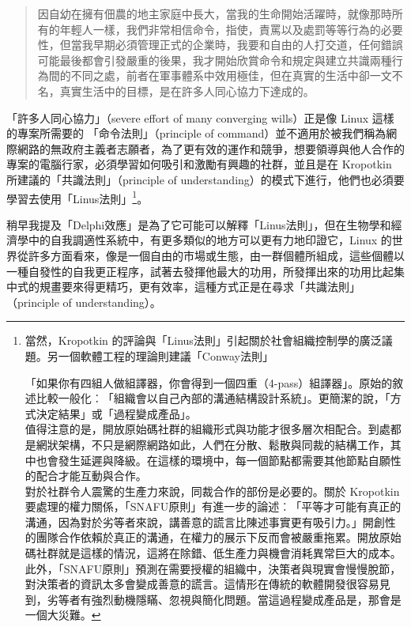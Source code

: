 \documentclass[12pt,]{article}
\makeatletter
\newcommand*{\shifttext}[2]{%
  \settowidth{\@tempdima}{#2}%
  \makebox[\@tempdima]{\hspace*{#1}#2}%
}
\makeatother
\begin{document}
\begin{quote}
因自幼在擁有佃農的地主家庭中長大，當我的生命開始活躍時，就像那時所有的年輕人一樣，我們非常相信命令，指使，責罵以及處罰等等行為的必要性，但當我早期必須管理正式的企業時，我要和自由的人打交道，任何錯誤可能最後都會引發嚴重的後果，我才開始欣賞命令和規定與建立共識兩種行為間的不同之處，前者在軍事體系中效用極佳，但在真實的生活中卻一文不名，真實生活中的目標，是在許多人同心協力下達成的。
\end{quote}

「許多人同心協力」（severe effort of many converging wills）正是像 Linux
這樣的專案所需要的 \shifttext{1pt}{---}\shifttext{-1pt}{---} 「命令法則」（principle of
command）並不適用於被我們稱為網際網路的無政府主義者志願者，為了更有效的運作和競爭，想要領導與他人合作的專案的電腦行家，必須學習如何吸引和激勵有興趣的社群，並且是在
Kropotkin 所建議的「共識法則」（principle of
understanding）的模式下進行，他們也必須要學習去使用「Linus法則」\footnote{當然，Kropotkin
  的評論與「Linus法則」引起關於社會組織控制學的廣泛議題。另一個軟體工程的理論則建議「Conway法則」
  \shifttext{1pt}{---}\shifttext{-1pt}{---}
  「如果你有四組人做組譯器，你會得到一個四重（4-pass）組譯器」。原始的敘述比較一般化︰「組織會以自己內部的溝通結構設計系統」。更簡潔的說，「方式決定結果」或「過程變成產品」。\\值得注意的是，開放原始碼社群的組織形式與功能才很多層次相配合。到處都是網狀架構，不只是網際網路如此，人們在分散、鬆散與同裁的結構工作，其中也會發生延遲與降級。在這樣的環境中，每一個節點都需要其他節點自願性的配合才能互動與合作。\\對於社群令人震驚的生產力來說，同裁合作的部份是必要的。關於
  Kropotkin
  要處理的權力關係，「SNAFU原則」有進一步的論述︰「平等才可能有真正的溝通，因為對於劣等者來說，講善意的謊言比陳述事實更有吸引力。」開創性的團隊合作依賴於真正的溝通，在權力的展示下反而會被嚴重拖累。開放原始碼社群就是這樣的情況，這將在除錯、低生產力與機會消耗異常巨大的成本。\\此外，「SNAFU原則」預測在需要授權的組織中，決策者與現實會慢慢脫節，對決策者的資訊太多會變成善意的謊言。這情形在傳統的軟體開發很容易見到，劣等者有強烈動機隱瞞、忽視與簡化問題。當這過程變成產品是，那會是一個大災難。}。

稍早我提及「Delphi效應」是為了它可能可以解釋「Linus法則」，但在生物學和經濟學中的自我調適性系統中，有更多類似的地方可以更有力地印證它，Linux
的世界從許多方面看來，像是一個自由的市場或生態，由一群個體所組成，這些個體以一種自發性的自我更正程序，試著去發揮他最大的功用，所發揮出來的功用比起集中式的規畫要來得更精巧，更有效率，這種方式正是在尋求「共識法則」（principle
of understanding）。
\end{document}
